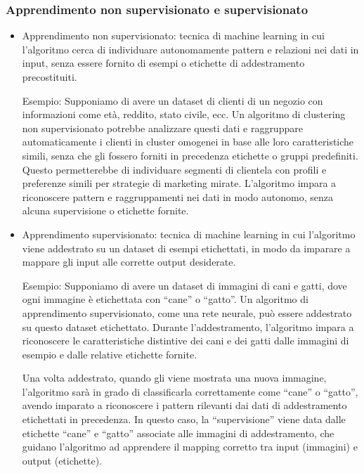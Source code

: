         \subsubsection{Apprendimento non supervisionato e supervisionato}
            \begin{itemize}
                \item
                    Apprendimento non supervisionato: tecnica di machine learning in cui l'algoritmo cerca di individuare autonomamente pattern e relazioni nei dati in input, senza essere fornito di esempi o etichette di addestramento precostituiti.

                    Esempio: Supponiamo di avere un dataset di clienti di un negozio con informazioni come età, reddito, stato civile, ecc. Un algoritmo di clustering non supervisionato potrebbe analizzare questi dati e raggruppare automaticamente i clienti in cluster omogenei in base alle loro caratteristiche simili, senza che gli fossero forniti in precedenza etichette o gruppi predefiniti. Questo permetterebbe di individuare segmenti di clientela con profili e preferenze simili per strategie di marketing mirate. L'algoritmo impara a riconoscere pattern e raggruppamenti nei dati in modo autonomo, senza alcuna supervisione o etichette fornite.

                \item
                    Apprendimento supervisionato: tecnica di machine learning in cui l'algoritmo viene addestrato su un dataset di esempi etichettati, in modo da imparare a mappare gli input alle corrette output desiderate.
            
                    Esempio: Supponiamo di avere un dataset di immagini di cani e gatti, dove ogni immagine è etichettata con ``cane'' o ``gatto''. Un algoritmo di apprendimento supervisionato, come una rete neurale, può essere addestrato su questo dataset etichettato. Durante l'addestramento, l'algoritmo impara a riconoscere le caratteristiche distintive dei cani e dei gatti dalle immagini di esempio e dalle relative etichette fornite.
                    
                    Una volta addestrato, quando gli viene mostrata una nuova immagine, l'algoritmo sarà in grado di classificarla correttamente come ``cane'' o ``gatto'', avendo imparato a riconoscere i pattern rilevanti dai dati di addestramento etichettati in precedenza. In questo caso, la ``supervisione'' viene data dalle etichette ``cane'' e ``gatto'' associate alle immagini di addestramento, che guidano l'algoritmo ad apprendere il mapping corretto tra input (immagini) e output (etichette).
            \end{itemize}

